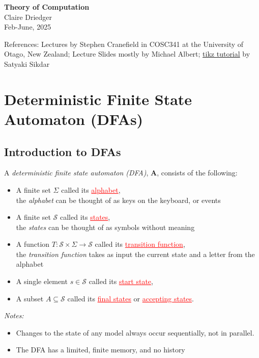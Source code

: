 \documentclass[11pt]{article}
\newcommand{\defn}[0]{\tcbhighmath[boxrule=0.5mm, colframe=cyan!20, colback=cyan!20, arc=10mm, size=fbox]{\textbf{DEF:}}}
\begin{document}
\begin{center}
    {\LARGE \textbf{Theory of Computation}} \\[0.5em]
    {\large Claire Driedger} \\[0.3em]
    {\normalsize Feb-June, 2025}
\end{center}
\noindent
\colorbox{gray!20}{%
  \parbox{\textwidth}{%
    References: Lectures by Stephen Cranefield in COSC341 at the University of Otago, New Zealand; Lecture Slides mostly by Michael Albert; \href{https://www3.nd.edu/~kogge/courses/cse30151-fa17/Public/other/tikz_tutorial.pdf}{tikz tutorial} by Satyaki Sikdar
  }
}

\tableofcontents
\newpage

\section{Deterministic Finite State Automaton (DFAs)}

\subsection{Introduction to DFAs}

\defn  A \textit{deterministic finite state automaton (DFA)}, \textbf{A}, consists of the following:
\begin{itemize}[itemsep=-2pt]\setlength{\baselineskip}{10pt}
  \hangindent=2em  
    \item A finite set $\Sigma$ called its \textcolor{red}{\underline{alphabet}}, \\ 
    \hspace{20em} \footnotesize{ the \textit{alphabet} can be thought of as keys on the keyboard, or events}
    \item \normalsize{A finite set $\mathcal{S}$ called its \textcolor{red}{\underline{states}}},\\
    \hspace{20em} \footnotesize{the \textit{states} can be thought of as symbols without meaning}
    \item \normalsize{A function $T :\mathcal{S} \times \Sigma \to \mathcal{S}$ called its \textcolor{red}{\underline{transition function}},}\\
    \hspace{20em} \footnotesize{the \textit{transition function} takes as input the current state and a letter from the alphabet}
    \item \normalsize{A single element $s \in \mathcal{S}$ called its \textcolor{red}{\underline{start state}},}
    \item \normalsize{A subset $A \subseteq \mathcal{S}$ called its \textcolor{red}{\underline{final states}} or \textcolor{red}{\underline{accepting states}}.}
\end{itemize}
\textit{Notes:} 
\begin{itemize}[itemsep=-2pt]\setlength{\baselineskip}{10pt}
  \item Changes to the state of any model always occur sequentially, not in parallel.
  \item The DFA has a limited, finite memory, and no history
\end{itemize}
\end{document}
